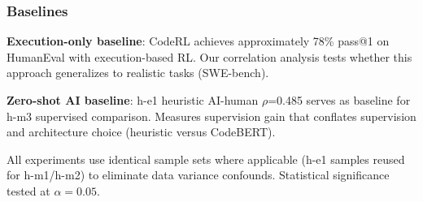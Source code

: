 \subsubsection{Baselines}

\textbf{Execution-only baseline}: CodeRL \citep{le2022coderl} achieves approximately 78\% pass@1 on HumanEval with execution-based RL. Our correlation analysis tests whether this approach generalizes to realistic tasks (SWE-bench).

\textbf{Zero-shot AI baseline}: h-e1 heuristic AI-human $\rho$=0.485 serves as baseline for h-m3 supervised comparison. Measures supervision gain that conflates supervision and architecture choice (heuristic versus CodeBERT).

All experiments use identical sample sets where applicable (h-e1 samples reused for h-m1/h-m2) to eliminate data variance confounds. Statistical significance tested at $\alpha =0.05$.
